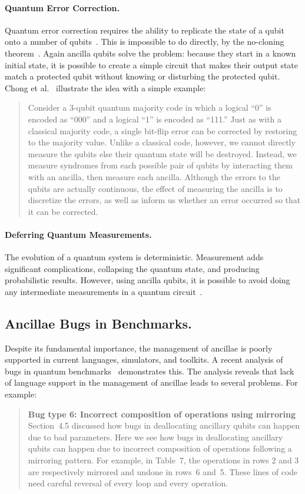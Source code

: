 \documentclass[sigplan,10pt,review,anonymous]{acmart}
\begin{document}
\paragraph*{Quantum Error Correction.}
Quantum error correction requires the ability to replicate the state of a
qubit onto a number of qubits~\cite[Ch.~3]{NAP25196}. This is impossible to do
directly, by the no-cloning
theorem~\cite{park1970concept,wootters1982single,dieks1982communication}. Again
ancilla qubits solve the problem: because they start in a known
initial state, it is possible to create a simple circuit that makes
their output state match a protected qubit without knowing or
disturbing the protected qubit. Chong et al.~\cite{sigarchblog}
illustrate the idea with a simple example:
\begin{quote}
Consider a 3-qubit quantum majority code in which a logical ``0'' is
encoded as ``000'' and a logical ``1'' is encoded as ``111.''  Just as with
a classical majority code, a single bit-flip error can be corrected by
restoring to the majority value.  Unlike a classical code, however, we
cannot directly measure the qubits else their quantum state will be
destroyed.  Instead, we measure syndromes from each possible pair of
qubits by interacting them with an ancilla, then measure each ancilla.
Although the errors to the qubits are actually continuous, the effect
of measuring the ancilla is to discretize the errors, as well as
inform us whether an error occurred so that it can be corrected.
\end{quote}

\paragraph*{Deferring Quantum Measurements.} The evolution of a
quantum system is deterministic. Measurement adds significant
complications, collapsing the quantum state, and producing
probabilistic results. However, using ancilla qubits, it is possible to
avoid doing any intermediate measurements in a quantum
circuit~\cite{dewolf}.

\subsection{Ancillae Bugs in Benchmarks.}
Despite its fundamental importance, the management of ancillae is
poorly supported in current languages, simulators, and toolkits.
A recent analysis of bugs in quantum
benchmarks~\cite{DBLP:conf/oopsla/HuangM18} demonstrates this. The analysis
reveals that lack of language support in the management of ancillae leads to
several problems. For example:
\begin{quote}
  \textbf{Bug type 6: Incorrect composition of operations using mirroring}
  Section~4.5 discussed how bugs in deallocating ancillary qubits can
  happen due to bad parameters. Here we see how bugs in deallocating
  ancillary qubits can happen due to incorrect composition of
  operations following a mirroring pattern. For example, in Table~7,
  the operations in rows 2 and 3 are respectively mirrored and undone
  in rows~6 and~5. These lines of code need careful reversal of every
  loop and every operation.
\end{quote}
\end{document}
